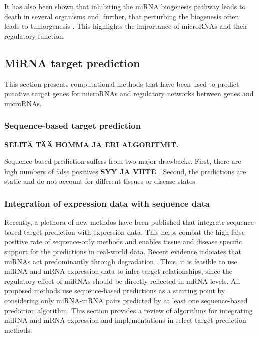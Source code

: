 It has also been shown that inhibiting the miRNA biogenesis pathway leads to
death in several organisms \cite{CITE} and, further, that perturbing the
biogenesis often leads to tumorgenesis \cite{CITE}. This highlights the
importance of microRNAs and their regulatory function.










\subsection{MiRNA target prediction}\label{mirna-target-prediction}

This section presents computational methods that have been used to predict
putative target genes for microRNAs and regulatory networks between genes and
microRNAs.





\subsubsection{Sequence-based target prediction}\label{sequence-based-target-
prediction}

\textbf{SELITÄ TÄÄ HOMMA JA ERI ALGORITMIT.}

Sequence-based prediction suffers from two major drawbacks. First, there are
high numbers of false positives \textbf{SYY JA VIITE
\cite{Sethupathy2006?}}. Second, the predictions are static and do not
account for different tissues or disease states.





\subsubsection{Integration of expression data with sequence data}\label
{integration-of-expression-data-with-sequence-data}

Recently, a plethora of new methdos have been published that integrate
sequence-based target prediction with expression data. This helps combat the
high false-positive rate of sequence-only methods and enables tissue and
disease specific support for the predictions in real-world data. Recent
evidence indicates that miRNAs act predominantly through degradation
\cite{CITE}. Thus, it is feasible to use miRNA and mRNA expression data to
infer target relationships, since the regulatory effect of miRNAs should be
directly reflected in mRNA levels. All proposed methods use sequence-based
predictions as a starting point by considering only miRNA-mRNA pairs predicted
by at least one sequence-based prediction algorithm. This section provides a
review of algorithms for integrating miRNA and mRNA expression and
implementations in select target prediction methods.

